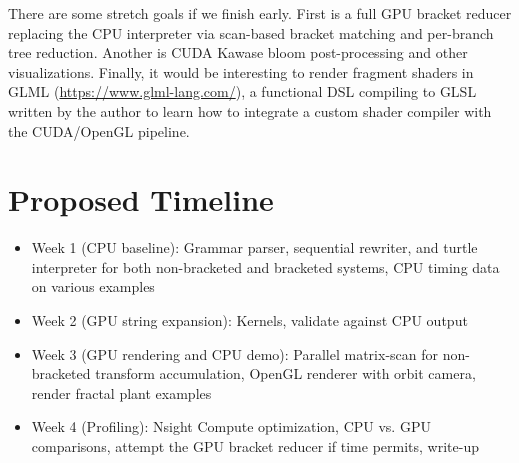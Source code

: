 \documentclass[12pt]{article}
\begin{document}
There are some stretch goals if we finish early. First is a full GPU bracket reducer replacing the CPU interpreter via scan-based bracket matching and per-branch tree reduction. Another is CUDA Kawase bloom post-processing and other visualizations. Finally, it would be interesting to render fragment shaders in GLML (\url{https://www.glml-lang.com/}), a functional DSL compiling to GLSL written by the author to learn how to integrate a custom shader compiler with the CUDA/OpenGL pipeline.

\section{Proposed Timeline}
\begin{itemize}
    \item Week 1 (CPU baseline): Grammar parser, sequential rewriter, and turtle interpreter for both non-bracketed and bracketed systems, CPU timing data on various examples
    \item Week 2 (GPU string expansion): Kernels, validate against CPU output
    \item Week 3 (GPU rendering and CPU demo): Parallel matrix-scan for non-bracketed transform accumulation, OpenGL renderer with orbit camera, render fractal plant examples
    \item Week 4 (Profiling): Nsight Compute optimization, CPU vs. GPU comparisons, attempt the GPU bracket reducer if time permits, write-up
\end{itemize}

\hfuzz=30pt
\printbibliography
\end{document}

